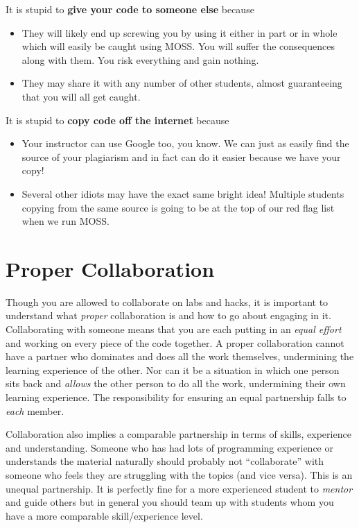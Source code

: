 \documentclass[12pt]{scrartcl}
\begin{document}
It is stupid to \textbf{give your code to someone else} because
\begin{itemize}
  \item They will likely end up screwing you by using it either in part or in whole which will easily be caught using MOSS.  You will suffer the consequences along with them.  You risk everything and gain nothing.
  \item They may share it with any number of other students, almost guaranteeing that you will all get caught.
\end{itemize}

It is stupid to \textbf{copy code off the internet} because
\begin{itemize}
  \item Your instructor can use Google too, you know.  We can just as easily find the source of your plagiarism and in fact can do it easier because we have your copy!
  \item Several other idiots may have the exact same bright idea!  Multiple students copying from the same source is going to be at the top of our red flag list when we run MOSS.
\end{itemize}

\section*{Proper Collaboration}

Though you are allowed to collaborate on labs and hacks, it is important to 
understand what \emph{proper} collaboration is and how to go about engaging
in it.  Collaborating with someone means that you are each putting in an 
\emph{equal effort} and working on every piece of the code together.  
A proper collaboration cannot have a partner who dominates and does all 
the work themselves, undermining the learning experience of the other.
Nor can it be a situation in which one person sits back and \emph{allows}
the other person to do all the work, undermining their own learning 
experience.  The responsibility for ensuring an equal partnership falls
to \emph{each} member.

Collaboration also implies a comparable partnership in terms of skills, 
experience and understanding.  Someone who has had lots of programming 
experience or understands the material naturally should probably not 
``collaborate'' with someone who feels they are struggling with the
topics (and vice versa).  This is an unequal partnership.  It is 
perfectly fine for a more experienced student to \emph{mentor} and 
guide others but in general you should team up with students whom 
you have a more comparable skill/experience level.
\end{document}
